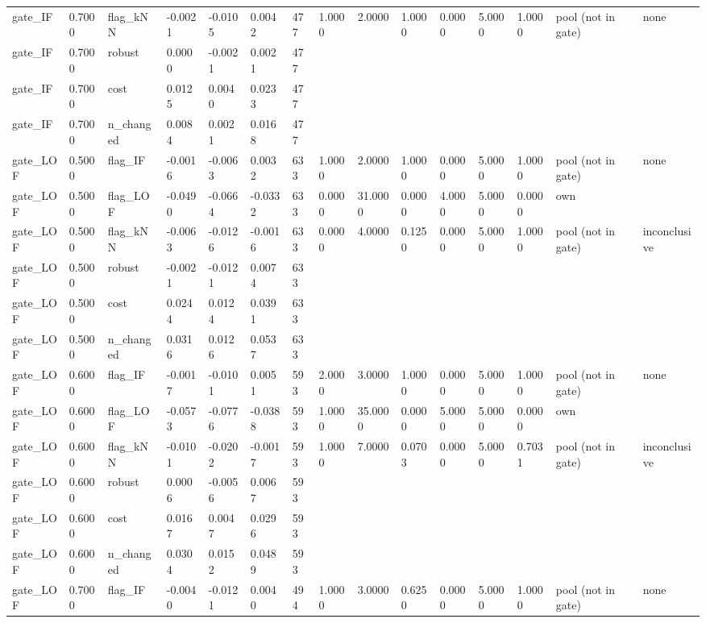 \begin{table}[t]
\begin{tabular}{lllllllllllllll}
gate\_IF & 0.7000 & flag\_kNN & -0.0021 & -0.0105 & 0.0042 & 477 & 1.0000 & 2.0000 & 1.0000 & 0.0000 & 5.0000 & 1.0000 & pool (not in gate) & none \\
gate\_IF & 0.7000 & robust & 0.0000 & -0.0021 & 0.0021 & 477 &  &  &  &  &  &  &  &  \\
gate\_IF & 0.7000 & cost & 0.0125 & 0.0040 & 0.0233 & 477 &  &  &  &  &  &  &  &  \\
gate\_IF & 0.7000 & n\_changed & 0.0084 & 0.0021 & 0.0168 & 477 &  &  &  &  &  &  &  &  \\
gate\_LOF & 0.5000 & flag\_IF & -0.0016 & -0.0063 & 0.0032 & 633 & 1.0000 & 2.0000 & 1.0000 & 0.0000 & 5.0000 & 1.0000 & pool (not in gate) & none \\
gate\_LOF & 0.5000 & flag\_LOF & -0.0490 & -0.0664 & -0.0332 & 633 & 0.0000 & 31.0000 & 0.0000 & 4.0000 & 5.0000 & 0.0000 & own &  \\
gate\_LOF & 0.5000 & flag\_kNN & -0.0063 & -0.0126 & -0.0016 & 633 & 0.0000 & 4.0000 & 0.1250 & 0.0000 & 5.0000 & 1.0000 & pool (not in gate) & inconclusive \\
gate\_LOF & 0.5000 & robust & -0.0021 & -0.0121 & 0.0074 & 633 &  &  &  &  &  &  &  &  \\
gate\_LOF & 0.5000 & cost & 0.0244 & 0.0124 & 0.0391 & 633 &  &  &  &  &  &  &  &  \\
gate\_LOF & 0.5000 & n\_changed & 0.0316 & 0.0126 & 0.0537 & 633 &  &  &  &  &  &  &  &  \\
gate\_LOF & 0.6000 & flag\_IF & -0.0017 & -0.0101 & 0.0051 & 593 & 2.0000 & 3.0000 & 1.0000 & 0.0000 & 5.0000 & 1.0000 & pool (not in gate) & none \\
gate\_LOF & 0.6000 & flag\_LOF & -0.0573 & -0.0776 & -0.0388 & 593 & 1.0000 & 35.0000 & 0.0000 & 5.0000 & 5.0000 & 0.0000 & own &  \\
gate\_LOF & 0.6000 & flag\_kNN & -0.0101 & -0.0202 & -0.0017 & 593 & 1.0000 & 7.0000 & 0.0703 & 0.0000 & 5.0000 & 0.7031 & pool (not in gate) & inconclusive \\
gate\_LOF & 0.6000 & robust & 0.0006 & -0.0056 & 0.0067 & 593 &  &  &  &  &  &  &  &  \\
gate\_LOF & 0.6000 & cost & 0.0167 & 0.0047 & 0.0296 & 593 &  &  &  &  &  &  &  &  \\
gate\_LOF & 0.6000 & n\_changed & 0.0304 & 0.0152 & 0.0489 & 593 &  &  &  &  &  &  &  &  \\
gate\_LOF & 0.7000 & flag\_IF & -0.0040 & -0.0121 & 0.0040 & 494 & 1.0000 & 3.0000 & 0.6250 & 0.0000 & 5.0000 & 1.0000 & pool (not in gate) & none \\

\end{tabular}
\end{table}
